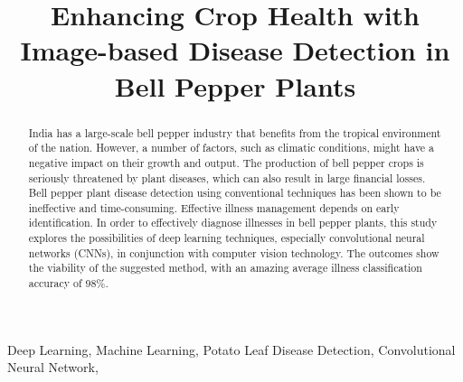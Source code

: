 \documentclass[conference]{IEEEtran}
\begin{document}
\title{Enhancing Crop Health with Image-based Disease Detection in Bell Pepper Plants}

\author{
\and
{}
}


\maketitle

\begin{abstract}

India has a large-scale bell pepper industry that benefits from the tropical environment of the nation. However, a number of factors, such as climatic conditions, might have a negative impact on their growth and output. The production of bell pepper crops is seriously threatened by plant diseases, which can also result in large financial losses. Bell pepper plant disease detection using conventional techniques has been shown to be ineffective and time-consuming. Effective illness management depends on early identification. In order to effectively diagnose illnesses in bell pepper plants, this study explores the possibilities of deep learning techniques, especially convolutional neural networks (CNNs), in conjunction with computer vision technology. The outcomes show the viability of the suggested method, with an amazing average illness classification accuracy of 98\%. \\

 
\end{abstract}


\begin{IEEEkeywords}
Deep Learning, Machine Learning, Potato Leaf Disease Detection, Convolutional Neural Network, 
\end{IEEEkeywords}
 
\end{document}
